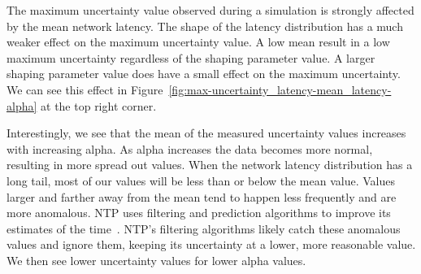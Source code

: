 



The maximum uncertainty value observed during a simulation 
is strongly affected by the mean network
latency. The shape of the latency distribution has a 
much weaker effect on the maximum uncertainty value. 
A low mean result in a low maximum uncertainty regardless 
of the shaping parameter value. A larger shaping parameter value
does have a small effect on the maximum uncertainty. We can see this effect in
Figure~\ref{fig:max-uncertainty_latency-mean_latency-alpha} at the top right corner.

Interestingly, we see that the mean of the measured uncertainty values
increases
with increasing alpha. As alpha increases the
data becomes more normal, resulting in more spread out values. 
When the network latency distribution has a
long tail, most of our values will be less than or below the mean
value. Values larger and farther away from the mean tend to happen
less frequently and are more anomalous. NTP uses filtering and prediction algorithms to improve its
estimates of the time~\citep{Burbank2010}. NTP's filtering algorithms 
likely catch these anomalous values and ignore them, keeping its uncertainty at a
lower, more reasonable value. We then see lower uncertainty values for lower alpha
values.

